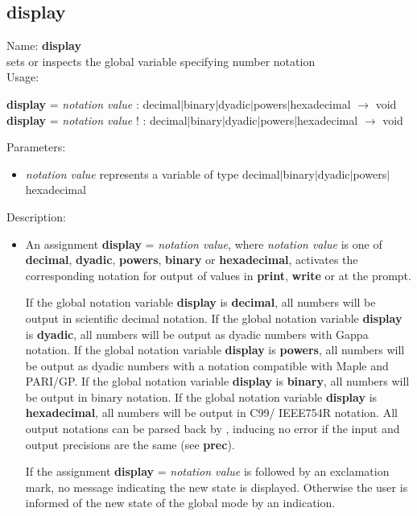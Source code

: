 \subsection{display}
\label{labdisplay}
\noindent Name: \textbf{display}\\
sets or inspects the global variable specifying number notation\\

\noindent Usage: 
\begin{center}
\textbf{display} = \emph{notation value} : \textsf{decimal$|$binary$|$dyadic$|$powers$|$hexadecimal} $\rightarrow$ \textsf{void}\\
\textbf{display} = \emph{notation value} ! : \textsf{decimal$|$binary$|$dyadic$|$powers$|$hexadecimal} $\rightarrow$ \textsf{void}\\
\end{center}
Parameters: 
\begin{itemize}
\item \emph{notation value} represents a variable of type \textsf{decimal$|$binary$|$dyadic$|$powers$|$hexadecimal}
\end{itemize}
\noindent Description: \begin{itemize}

\item An assignment \textbf{display} = \emph{notation value}, where \emph{notation value} is
   one of \textbf{decimal}, \textbf{dyadic}, \textbf{powers}, \textbf{binary} or \textbf{hexadecimal}, activates
   the corresponding notation for output of values in \textbf{print}, \textbf{write} or
   at the \sollya prompt.
    
   If the global notation variable \textbf{display} is \textbf{decimal}, all numbers will
   be output in scientific decimal notation.  If the global notation
   variable \textbf{display} is \textbf{dyadic}, all numbers will be output as dyadic
   numbers with Gappa notation.  If the global notation variable \textbf{display}
   is \textbf{powers}, all numbers will be output as dyadic numbers with a
   notation compatible with Maple and PARI/GP.  If the global notation
   variable \textbf{display} is \textbf{binary}, all numbers will be output in binary
   notation.  If the global notation variable \textbf{display} is \textbf{hexadecimal},
   all numbers will be output in C99/ IEEE754R notation.  All output
   notations can be parsed back by \sollya, inducing no error if the input
   and output precisions are the same (see \textbf{prec}).
    
   If the assignment \textbf{display} = \emph{notation value} is followed by an
   exclamation mark, no message indicating the new state is
   displayed. Otherwise the user is informed of the new state of the
   global mode by an indication.
\end{itemize}
